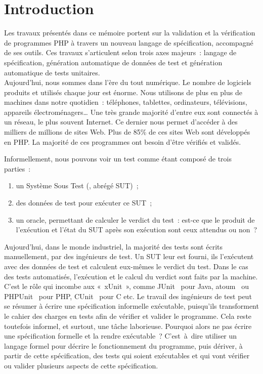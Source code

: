 \chapter{Introduction}
\label{chapter:introduction}

\mminitoc

Les travaux présentés dans ce mémoire portent sur la validation et la
vérification de programmes PHP à travers un nouveau langage de spécification,
accompagné de ses outils. Ces travaux s'articulent selon trois axes majeurs~:
langage de spécification, génération automatique de données de test et
génération automatique de tests unitaires. \\

Aujourd'hui, nous sommes dans l'ère du tout numérique. Le nombre de logiciels
produits et utilisés chaque jour est énorme. Nous utilisons de plus en plus de
machines dans notre quotidien~: téléphones, tablettes, ordinateurs, télévisions,
appareils électroménagers… Une très grande majorité d'entre eux sont connectés à
un réseau, le plus souvent Internet. Ce dernier nous permet d'accéder à des
milliers de millions de sites Web. Plus de 85\% de ces sites Web sont développés
en PHP. La majorité de ces programmes ont besoin d'être vérifiés et validés.

Informellement, nous pouvons voir un test comme étant composé de trois parties~:
%
\begin{enumerate}

\item un Système Sous Test (, abrégé {\strong
SUT})~;

\item des {\strong données de test} pour exécuter ce SUT~;

\item un {\strong oracle}, permettant de calculer le verdict du test~: est-ce
que le produit de l'exécution et l'état du SUT après son exécution sont ceux
attendus ou non~?

\end{enumerate}

Aujourd'hui, dans le monde industriel, la majorité des tests sont écrits
{\strong manuellement}, par des ingénieurs de test. Un SUT leur est fourni, ils
l'exécutent avec des données de test et calculent eux-mêmes le verdict du test.
Dans le cas des tests {\strong automatisés}, l'exécution et le calcul du verdict
sont faits par la machine. C'est le rôle qui incombe aux 
«~xUnit~», comme JUnit~ pour Java, atoum~ ou
PHPUnit~ pour PHP, CUnit~ pour C etc. Le travail des
ingénieurs de test peut se résumer à écrire une spécification informelle
exécutable, puisqu'ils transforment le cahier des charges en tests afin de
vérifier et valider le programme. Cela reste toutefois informel, et surtout, une
tâche laborieuse. Pourquoi alors ne pas écrire une spécification formelle et la
rendre exécutable~? C'est~à~dire utiliser un langage formel pour décrire le
fonctionnement du programme, puis dériver, à partir de cette spécification, des
tests qui soient exécutables et qui vont vérifier ou valider plusieurs aspects
de cette spécification.

